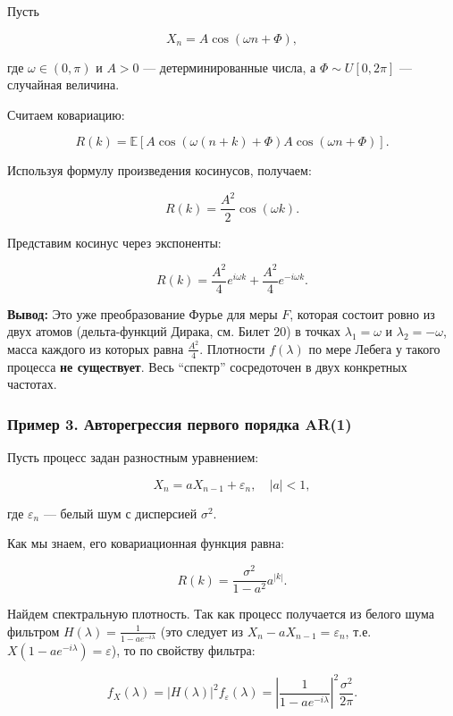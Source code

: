 \documentclass[
  11pt,
  a4paper,
]{article}
\begin{document}
Пусть

\[
X_n = A \cos(\omega n + \Phi),
\]

где \(\omega \in (0, \pi)\) и \(A > 0\) --- детерминированные числа, а
\(\Phi \sim U[0, 2\pi]\) --- случайная величина.

Считаем ковариацию:

\[
R(k) = \mathbb E[A \cos(\omega(n+k) + \Phi) A \cos(\omega n + \Phi)].
\]

Используя формулу произведения косинусов, получаем:

\[
R(k) = \frac{A^2}{2} \cos(\omega k).
\]

Представим косинус через экспоненты:

\[
R(k) = \frac{A^2}{4} e^{i \omega k} + \frac{A^2}{4} e^{-i \omega k}.
\]

\textbf{Вывод:} Это уже преобразование Фурье для меры \(F\), которая
состоит ровно из двух атомов (дельта-функций Дирака, см. Билет 20) в
точках \(\lambda_1 = \omega\) и \(\lambda_2 = -\omega\), масса каждого
из которых равна \(\frac{A^2}{4}\). Плотности \(f(\lambda)\) по мере
Лебега у такого процесса \textbf{не существует}. Весь ``спектр''
сосредоточен в двух конкретных частотах.

\subsubsection{Пример 3. Авторегрессия первого порядка
AR(1)}\label{ux43fux440ux438ux43cux435ux440-3.-ux430ux432ux442ux43eux440ux435ux433ux440ux435ux441ux441ux438ux44f-ux43fux435ux440ux432ux43eux433ux43e-ux43fux43eux440ux44fux434ux43aux430-ar1}

Пусть процесс задан разностным уравнением:

\[
X_n = a X_{n-1} + \varepsilon_n, \quad |a| < 1,
\]

где \(\varepsilon_n\) --- белый шум с дисперсией \(\sigma^2\).

Как мы знаем, его ковариационная функция равна:

\[
R(k) = \frac{\sigma^2}{1-a^2} a^{|k|}.
\]

Найдем спектральную плотность. Так как процесс получается из белого шума
фильтром \(H(\lambda) = \frac{1}{1 - a e^{-i\lambda}}\) (это следует из
\(X_n - a X_{n-1} = \varepsilon_n\), т.е.
\(X(1 - a e^{-i\lambda}) = \varepsilon\)), то по свойству фильтра:

\[
f_X(\lambda) = |H(\lambda)|^2 f_\varepsilon(\lambda) = \left| \frac{1}{1 - a e^{-i\lambda}} \right|^2 \frac{\sigma^2}{2\pi}.
\]
\end{document}
